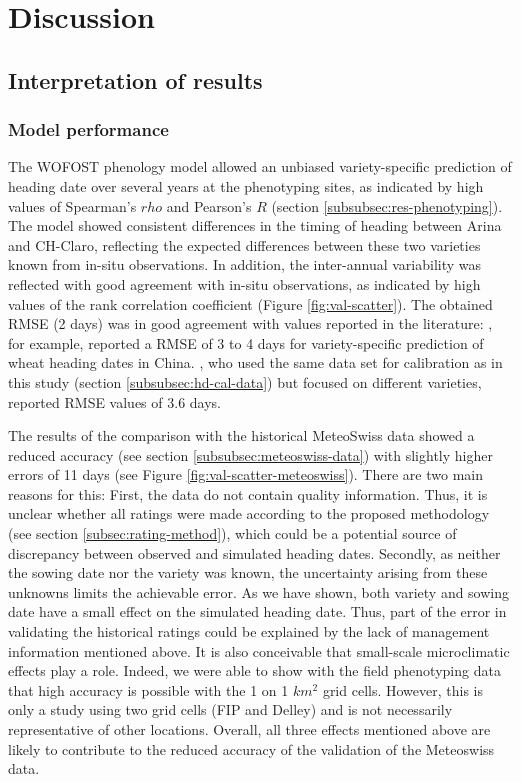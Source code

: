 \section{Discussion}
\label{sec:hd-discussion}
\subsection{Interpretation of results}
\subsubsection{Model performance}
The WOFOST phenology model allowed an unbiased variety-specific prediction of heading date over several years at the phenotyping sites, as indicated by high values of Spearman's $rho$ and Pearson's $R$ (section \ref{subsubsec:res-phenotyping}). The model showed consistent differences in the timing of heading between Arina and CH-Claro, reflecting the expected differences between these two varieties known from in-situ observations. In addition, the inter-annual variability was reflected with good agreement with in-situ observations, as indicated by high values of the rank correlation coefficient (Figure \ref{fig:val-scatter}). The obtained \gls{RMSE} (2 days) was in good agreement with values reported in the literature: \cite{liu_uncertainty_2018}, for example, reported a \gls{RMSE} of 3 to 4 days for variety-specific prediction of wheat heading dates in China. \cite{rogger_can_2021}, who used the same data set for calibration as in this study (section \ref{subsubsec:hd-cal-data}) but focused on different varieties, reported \gls{RMSE} values of 3.6 days.

The results of the comparison with the historical MeteoSwiss data showed a reduced accuracy (see section \ref{subsubsec:meteoswiss-data}) with slightly higher errors of 11 days (see Figure \ref{fig:val-scatter-meteoswiss}). There are two main reasons for this: First, the data do not contain quality information. Thus, it is unclear whether all ratings were made according to the proposed methodology (see section \ref{subsec:rating-method}), which could be a potential source of discrepancy between observed and simulated heading dates. Secondly, as neither the sowing date nor the variety was known, the uncertainty arising from these unknowns limits the achievable error. As we have shown, both variety and sowing date have a small effect on the simulated heading date. Thus, part of the error in validating the historical ratings could be explained by the lack of management information mentioned above. It is also conceivable that small-scale microclimatic effects play a role. Indeed, we were able to show with the field phenotyping data that high accuracy is possible with the 1 on 1 $km^2$ grid cells. However, this is only a study using two grid cells (FIP and Delley) and is not necessarily representative of other locations. Overall, all three effects mentioned above are likely to contribute to the reduced accuracy of the validation of the Meteoswiss data.

